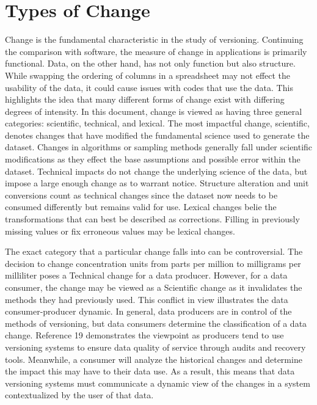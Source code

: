 \section{Types of Change}

Change is the fundamental characteristic in the study of versioning.  Continuing the comparison with software, the measure of change in applications is primarily functional.  Data, on the other hand, has not only function but also structure.  While swapping the ordering of columns in a spreadsheet may not effect the usability of the data, it could cause issues with codes that use the data.  This highlights the idea that many different forms of change exist with differing degrees of intensity.  In this document, change is viewed as having three general categories: scientific, technical, and lexical.  The most impactful change, scientific, denotes changes that have modified the fundamental science used to generate the dataset.  Changes in algorithms or sampling methods generally fall under scientific modifications as they effect the base assumptions and possible error within the dataset.  Technical impacts do not change the underlying science of the data, but impose a large enough change as to warrant notice.  Structure alteration and unit conversions count as technical changes since the dataset now needs to be consumed differently but remains valid for use.  Lexical changes belie the transformations that can best be described as corrections.  Filling in previously missing values or fix erroneous values may be lexical changes.

The exact category that a particular change falls into can be controversial.  The decision to change concentration units from parts per million to milligrams per milliliter poses a Technical change for a data producer.  However, for a data consumer, the change may be viewed as a Scientific change as it invalidates the methods they had previously used.  This conflict in view illustrates the data consumer-producer dynamic.  In general, data producers are in control of the methods of versioning, but data consumers determine the classification of a data change.  Reference 19 demonstrates the viewpoint as producers tend to use versioning systems to ensure data quality of service through audits and recovery tools.  Meanwhile, a consumer will analyze the historical changes and determine the impact this may have to their data use.  As a result, this means that data versioning systems must communicate a dynamic view of the changes in a system contextualized by the user of that data.

